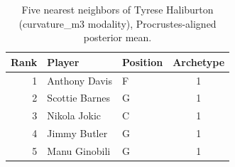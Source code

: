 \begin{table}[htbp]
  \centering\small
  \begin{tabular}{rllc}
    \toprule
    Rank & Player & Position & Archetype \\
    \midrule
    1 & Anthony Davis & F & 1 \\
    2 & Scottie Barnes & G & 1 \\
    3 & Nikola Jokic & C & 1 \\
    4 & Jimmy Butler & G & 1 \\
    5 & Manu Ginobili & G & 1 \\
    \bottomrule
  \end{tabular}
  \caption{Five nearest neighbors of Tyrese Haliburton (curvature_m3 modality), Procrustes-aligned posterior mean.}
  \label{tab:Tyrese_Haliburton_neighbors_curvature_m3}
\end{table}

